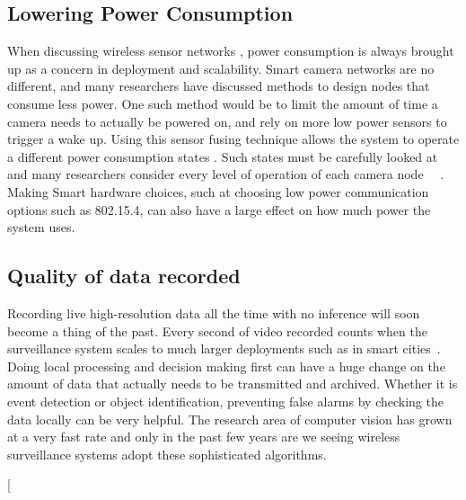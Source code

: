 \documentclass[journal,transmag]{IEEEtran}
\begin{document}
\subsection{Lowering Power Consumption}
When discussing wireless sensor networks , power consumption is always brought up as a concern in deployment and scalability. Smart camera networks are 
no different, and many researchers have discussed methods to design nodes that consume less power. One such method would be to limit the amount of time 
a camera needs to actually be powered on, and rely on more low power sensors to trigger a wake up. Using this sensor fusing technique allows the system
to operate a different power consumption states . Such states must be carefully looked at and many researchers 
consider every level of operation of each camera node ~\cite{AccLatEnergy}~\cite{EnergyCons}. Making Smart hardware choices, such at choosing low power communication
options such as 802.15.4, can also have a large effect on how much power the system uses.

\subsection{Quality of data recorded}
Recording live high-resolution data all the time with no inference will soon become a thing of the past. Every second of video recorded counts when the 
surveillance system scales to much larger deployments such as in smart cities~\cite{HuSIMS}. Doing local processing and decision making first can have 
a huge change on the amount of data that actually needs to be transmitted and archived. Whether it is event detection or object identification, preventing 
false alarms by checking the data locally can be very helpful. The research area of computer vision has grown at a very fast rate and only in the past few years
are we seeing wireless surveillance systems adopt these sophisticated algorithms.


\twocolumn[
\end{document}
